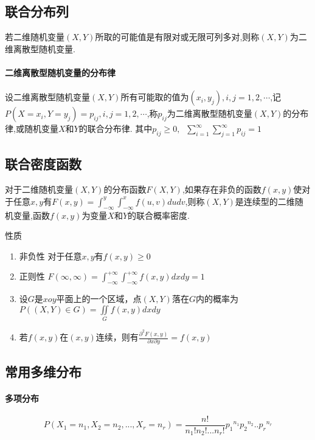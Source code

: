 \subsection{联合分布列}
\begin{definition}
    若二维随机变量$(X,Y)$所取的可能值是有限对或无限可列多对,则称$(X,Y)$为二维离散型随机变量.
\end{definition}

\paragraph{二维离散型随机变量的分布律}
设二维离散型随机变量$(X,Y)$所有可能取的值为$(x_i,y_j),i,j=1,2,\cdots$,记$P(X=x_i,Y=y_j)=p_{ij},i,j=1,2,\cdots$,称$p_{ij}$为二维离散型随机变量$(X,Y)$的分布律,或随机变量$X \text{和} Y$的联合分布律.
其中${p_{ij}} \ge 0,\;\;\sum\limits_{i = 1}^\infty  {\sum\limits_{j = 1}^\infty  {{p_{ij}}} }  = 1$

\subsection{联合密度函数}
\begin{definition}
    对于二维随机变量$(X,Y)$的分布函数$F(X,Y)$,如果存在非负的函数$f(x,y)$使对于任意$x,y$有$F(x,y) = \int_{-\infty}^y {\int_{-\infty}^x {f(u,v)dudv} } $,则称$(X,Y)$是连续型的二维随机变量,函数$f(x,y)$为变量$X \text{和} Y$的联合概率密度.
\end{definition}

\begin{property} 性质
    \begin{enumerate}
        \item 非负性 对于任意$x,y$有$f(x,y) \ge 0$
        \item 正则性 $F(\infty,\infty)=\int_{-\infty}^{+\infty} {\int_{-\infty}^{+\infty} {f(x,y)dxdy} } = 1$
        \item 设$G$是$xoy$平面上的一个区域，点$(X,Y)$落在$G$内的概率为$P( (X,Y) \in G)  = \iint\limits_G {f(x,y)dxdy}$
        \item 若$f(x,y)$在$(x,y)$连续，则有$\frac{{{\partial ^2}F(x,y)}}{{\partial x\partial y}} = f(x,y)$
    \end{enumerate}

\end{property}
\subsection{常用多维分布}
\paragraph{多项分布}
$$P({X_1} = {n_1},{X_2} = {n_2},...,{X_r} = {n_r}) = \frac{{n!}}{{{n_1}!{n_2}!...{n_r}!}}{p_1}^{{n_1}}{p_2}^{{n_2}}..{p_r}^{{n_r}}$$
